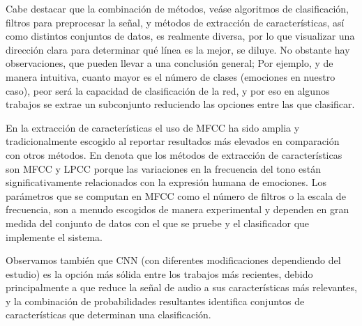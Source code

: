 \documentclass[11pt,a4paper,spanish]{book}
\begin{document}
	Cabe destacar que la combinación de métodos, veáse algoritmos de clasificación, filtros para preprocesar la señal, y métodos de extracción de características, así como distintos conjuntos de datos, es realmente diversa, por lo que visualizar una dirección clara para determinar qué línea es la mejor, se diluye. No obstante hay observaciones, que pueden llevar a una conclusión general; Por ejemplo, y de manera intuitiva, cuanto mayor es el número de clases (emociones en nuestro caso), peor será la capacidad de clasificación de la red, y por eso en algunos trabajos se extrae un subconjunto reduciendo las opciones entre las que clasificar.  
	
	En la extracción de características el uso de MFCC ha sido amplia y tradicionalmente escogido al reportar resultados más elevados en comparación con otros métodos. En \cite{Langari2020} denota que los métodos de extracción de características son MFCC y LPCC porque las variaciones en la frecuencia del tono están significativamente relacionados con la expresión humana de emociones. Los parámetros que se computan en MFCC como el número de filtros o la escala de frecuencia, son a menudo escogidos de manera experimental y dependen en gran medida del conjunto de datos con el que se pruebe y el clasificador que implemente el sistema.
	
	Observamos también que CNN (con diferentes modificaciones dependiendo del estudio) es la opción más sólida entre los trabajos más recientes, debido principalmente a que reduce la señal de audio a sus características más relevantes, y la combinación de probabilidades resultantes identifica conjuntos de características que determinan una clasificación.
	

	
	
	
		
	
	\printbibliography
\end{document}

